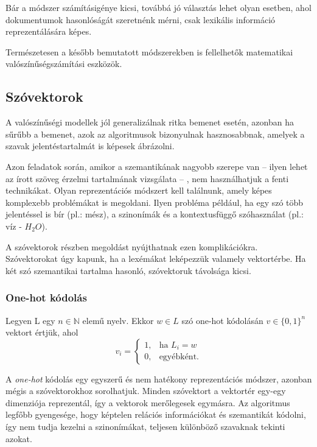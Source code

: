 Bár a módszer számításigénye kicsi, továbbá jó választás lehet olyan esetben, ahol dokumentumok hasonlóságát szeretnénk mérni, csak lexikális információ reprezentálására képes. 

\begin{note}
	Természetesen a később bemutatott módszerekben is fellelhetők matematikai valószínűségszámítási eszközök.
\end{note}

\subsection{Szóvektorok}

A valószínűségi modellek jól generalizálnak ritka bemenet esetén, azonban ha sűrűbb a bemenet, azok az algoritmusok bizonyulnak hasznosabbnak, amelyek a szavak jelentéstartalmát is képesek ábrázolni.

Azon feladatok során, amikor a szemantikának nagyobb szerepe van – ilyen lehet az írott szöveg érzelmi tartalmának vizsgálata – , nem használhatjuk a fenti technikákat. Olyan reprezentációs módszert kell találnunk, amely képes komplexebb problémákat is megoldani. Ilyen probléma például, ha egy szó több jelentéssel is bír (pl.: mész), a szinonímák és a kontextusfüggő szóhasználat (pl.: víz - $H_2O$).

A szóvektorok részben megoldást nyújthatnak ezen komplikációkra. Szóvektorokat úgy kapunk, ha a lexémákat leképezzük valamely vektortérbe. Ha két szó szemantikai tartalma hasonló, szóvektoruk távolsága kicsi.

\subsubsection{One-hot kódolás}

\begin{definition}
Legyen L egy $n \in \mathbb{N}$ elemű nyelv. Ekkor $w \in L$ szó one-hot kódolásán $v \in \{0,1\}^n$ vektort értjük, ahol 
\[
v_i= 
\begin{cases}
1,				& \text{ha } L_i = w\\
0,              & \text{egyébként.}
\end{cases}
\]
\end{definition}

A \textit{one-hot} kódolás egy egyszerű és nem hatékony reprezentációs módszer, azonban mégis a szóvektorokhoz sorolhatjuk. Minden szóvektort a vektortér egy-egy dimenziója reprezentál, így a vektorok merőlegesek egymásra. Az algoritmus legfőbb gyengesége, hogy képtelen relációs információkat és szemantikát  kódolni, így nem tudja kezelni a szinonímákat, teljesen különböző szavaknak tekinti azokat.

